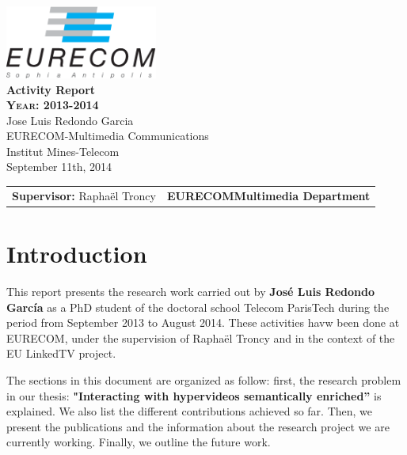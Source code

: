 \documentclass[a4paper,11pt]{report}
\begin{document}
\begin{titlepage}
\begin{center}
\includegraphics[width=5cm]{EURECOM_logo_quadri}
\\[3cm]
\textbf{\Huge{Activity Report}}
\\[2cm]
\textbf{\textsc{\LARGE{Year: 2013-2014}}}
\\[0.5cm]
\LARGE{Jose Luis Redondo Garcia}
\\[0.5cm]
\small{EURECOM-Multimedia Communications}
\\
\large{Institut Mines-Telecom}
\\
\large{September 11th, 2014}
\\[8cm]
\begin{tabular}{p{8cm} p{8.5cm}}
\small{\textbf{Supervisor:}\newline
Rapha\"el Troncy} 
&
\small{\textbf{EURECOM\newline Multimedia Department}}
\end{tabular}
\end{center}
\end{titlepage}


\chapter*{Introduction}

This report presents the research work carried out by \textbf{Jos\'e Luis Redondo Garc\'ia} as a PhD student of the doctoral school Telecom ParisTech during the period from September 2013 to August 2014. These activities havw been done at EURECOM, under the supervision of Rapha\"el Troncy and in the context of the EU LinkedTV project.

The sections in this document are organized as follow: first, the research problem in our thesis: \textbf{"Interacting with hypervideos semantically enriched''} is explained. We also list the different contributions achieved so far. Then, we present the publications and the information about the research project we are currently working. Finally, we outline the future work.

\end{document}
